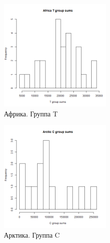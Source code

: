 \begin{figure}[!htb]
    \centering
    \includegraphics[width=0.5\textwidth]{fig/Africa_T.png}
    \caption{Африка. Группа T}
\end{figure}
\newpage
\begin{figure}[!htb]
    \centering
    \includegraphics[width=0.5\textwidth]{fig/Arctic_C.png}
    \caption{Арктика. Группа C}
\end{figure}

